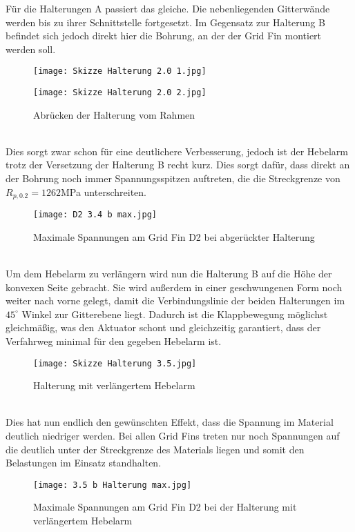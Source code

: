 Für die Halterungen A passiert das gleiche. Die nebenliegenden Gitterwände werden bis zu ihrer Schnittstelle fortgesetzt. Im Gegensatz zur Halterung B befindet sich jedoch direkt hier die Bohrung, an der der Grid Fin montiert werden soll.
\begin{figure}[h]
	\begin{minipage}[t]{0.45\linewidth}
		\centering
		\texttt{[image: Skizze Halterung 2.0 1.jpg]}
	\end{minipage}
	\hfill
	\begin{minipage}[t]{0.45\linewidth}
		\centering
		\texttt{[image: Skizze Halterung 2.0 2.jpg]}
	\end{minipage}
	\caption{Abrücken der Halterung vom Rahmen}
\end{figure}\\
Dies sorgt zwar schon für eine deutlichere Verbesserung, jedoch ist der Hebelarm trotz der Versetzung der Halterung B recht kurz. Dies sorgt dafür, dass direkt an der Bohrung noch immer Spannungsspitzen auftreten, die die Streckgrenze von $R_{p, 0.2} = 1262$MPa unterschreiten.
\begin{figure}[h] 
	\centering
	\texttt{[image: D2 3.4 b max.jpg]}
	\caption{Maximale Spannungen am Grid Fin D2 bei abgerückter Halterung}
\end{figure}\\
Um dem Hebelarm zu verlängern wird nun die Halterung B auf die Höhe der konvexen Seite gebracht. Sie wird außerdem in einer geschwungenen Form noch weiter nach vorne gelegt, damit die Verbindungslinie der beiden Halterungen im $45^\circ$ Winkel zur Gitterebene liegt. Dadurch ist die Klappbewegung möglichst gleichmäßig, was den Aktuator schont und gleichzeitig garantiert, dass der Verfahrweg minimal für den gegeben Hebelarm ist.
\begin{figure}[h] 
	\centering
	\texttt{[image: Skizze Halterung 3.5.jpg]}
	\caption{Halterung mit verlängertem Hebelarm}
\end{figure}\\
Dies hat nun endlich den gewünschten Effekt, dass die Spannung im Material deutlich niedriger werden. Bei allen Grid Fins treten nur noch Spannungen auf die deutlich unter der Streckgrenze des Materials liegen und somit den Belastungen im Einsatz standhalten.
\begin{figure}[h] 
	\centering
	\texttt{[image: 3.5 b Halterung max.jpg]}
	\caption{Maximale Spannungen am Grid Fin D2 bei der Halterung mit verlängertem Hebelarm}
\end{figure}\\
